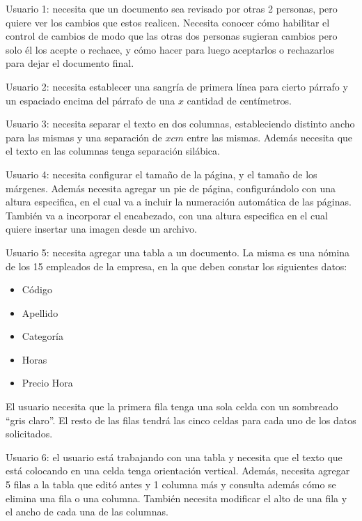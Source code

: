 \documentclass[12pt]{article}
\begin{document}
\begin{description}

    \item{Usuario 1}: necesita que un documento sea revisado por otras 2
    personas, pero quiere ver los cambios que estos realicen. Necesita conocer
    cómo habilitar el control de cambios de modo que las otras dos personas
    sugieran cambios pero solo él los acepte o rechace, y cómo hacer para
    luego aceptarlos o rechazarlos para dejar el documento final.

    \item{Usuario 2}: necesita establecer una sangría de primera línea para
    cierto párrafo y un espaciado encima del párrafo de una $x$ cantidad de
    centímetros.

    \item{Usuario 3}: necesita separar el texto en dos columnas, estableciendo
    distinto ancho para las mismas y una separación de $xcm$ entre las mismas.
    Además necesita que el texto en las columnas tenga separación silábica.

    \item{Usuario 4}: necesita configurar el tamaño de la página, y el tamaño
    de los márgenes. Además necesita agregar un pie de página, configurándolo
    con una altura especifica, en el cual va a incluir la numeración
    automática de las páginas. También va a incorporar el encabezado, con una
    altura especifica en el cual quiere insertar una imagen desde un archivo.

    \item{Usuario 5}: necesita agregar una tabla a un documento. La misma es
    una nómina de los 15 empleados de la empresa, en la que deben constar los
    siguientes datos:

    \begin{itemize}
        \item Código
        \item Apellido
        \item Categoría
        \item Horas
        \item Precio Hora
    \end{itemize}

    El usuario necesita que la primera fila tenga una sola celda con un
    sombreado “gris claro”. El resto de las filas tendrá las cinco celdas para
    cada uno de los datos solicitados.

    \item{Usuario 6}: el usuario está trabajando con una tabla y necesita que
    el texto que está colocando en una celda tenga orientación vertical.
    Además, necesita agregar 5 filas a la tabla que editó antes y 1 columna
    más y consulta además cómo se elimina una fila o una columna. También
    necesita modificar el alto de una fila y el ancho de cada una de las
    columnas.


\end{description}
\end{document}
